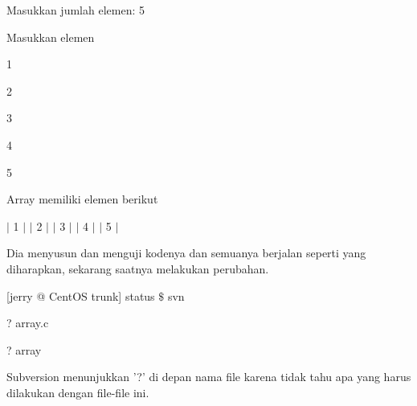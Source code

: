 \noindent 
 \hspace*{0.5in} Masukkan jumlah elemen: 5 \par
\noindent 
 \hspace*{0.5in} Masukkan elemen \par
 \vspace{\baselineskip}
\noindent 
 \hspace*{0.5in}  \hspace*{0.5in} 1 \par
\noindent 
 \hspace*{0.5in}  \hspace*{0.5in} 2 \par
\noindent 
 \hspace*{0.5in}  \hspace*{0.5in} 3 \par
\noindent 
 \hspace*{0.5in}  \hspace*{0.5in} 4 \par
\noindent 
 \hspace*{0.5in}  \hspace*{0.5in} 5 \par
 \vspace{\baselineskip}
\noindent 
 \hspace*{0.5in} Array memiliki elemen berikut \par
\noindent 
 \hspace*{0.5in}  \hspace*{0.5in}  $  \vert  $ 1  $  \vert  $  $  \vert  $ 2  $  \vert  $  $  \vert  $ 3  $  \vert  $  $  \vert  $ 4  $  \vert  $  $  \vert  $ 5  $  \vert  $ \par
\vspace{12pt}
\vspace{\baselineskip}
\noindent 
Dia menyusun dan menguji kodenya dan semuanya berjalan seperti yang diharapkan, sekarang saatnya melakukan perubahan. \par
\vspace{\baselineskip}
\noindent 
 \hspace*{0.5in} [jerry @ CentOS trunk] status  $  \$  $ svn \par
\noindent 
 \hspace*{0.5in} ? array.c \par
\noindent 
 \hspace*{0.5in} ? array \par
 \vspace{\baselineskip}
\noindent 
Subversion menunjukkan '?' di depan nama file karena tidak tahu apa yang harus dilakukan dengan file-file ini. \par
